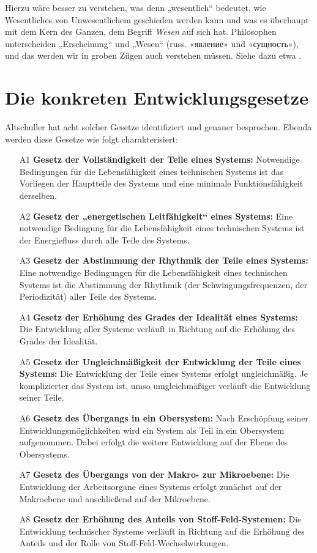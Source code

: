\documentclass[11pt,a4paper]{article}
\begin{document}
Hierzu wäre besser zu verstehen, was denn „wesentlich“ bedeutet, wie
Wesentliches von Unwesentlichem geschieden werden kann und was es überhaupt
mit dem Kern des Ganzen, dem Begriff \emph{Wesen} auf sich hat.  Philosophen
unterscheiden „Erscheinung“ und „Wesen“
(russ. \foreignlanguage{russian}{«явление»} und
\foreignlanguage{russian}{«сущность»}), und das werden wir in groben Zügen
auch verstehen müssen. Siehe dazu etwa \cite{Schlemm2004}.
\newpage

\section{Die konkreten Entwicklungsgesetze}

Altschuller \cite[S. 124\,ff.]{Altschuller1984} hat acht solcher Gesetze
identifiziert und genauer besprochen. Ebenda werden diese Gesetze wie folgt
charakterisiert:
\begin{enumerate}[noitemsep]
\item[A1] \textbf{Gesetz der Vollständigkeit der Teile eines Systems:}
  Notwendige Bedingungen für die Lebensfähigkeit eines technischen Systems ist
  das Vorliegen der Hauptteile des Systems und eine minimale
  Funktionsfähigkeit derselben.
\item[A2] \textbf{Gesetz der „energetischen Leitfähigkeit“ eines Systems:}
  Eine notwendige Bedingung für die Lebensfähigkeit eines technischen Systems
  ist der Energiefluss durch alle Teile des Systems.
\item[A3] \textbf{Gesetz der Abstimmung der Rhythmik der Teile eines Systems:}
  Eine notwendige Bedingungen für die Lebensfähigkeit eines technischen
  Systems ist die Abstimmung der Rhythmik (der Schwingungsfrequenzen, der
  Periodizität) aller Teile des Systems.
\item[A4] \textbf{Gesetz der Erhöhung des Grades der Idealität eines Systems:}
  Die Entwicklung aller Systeme verläuft in Richtung auf die Erhöhung des
  Grades der Idealität.
\item[A5] \textbf{Gesetz der Ungleichmäßigkeit der Entwicklung der Teile eines
  Systems:} Die Entwicklung der Teile eines Systems erfolgt ungleichmäßig. Je
  komplizierter das System ist, umso umgleichmäßiger verläuft die Entwicklung
  seiner Teile.
\item[A6] \textbf{Gesetz des Übergangs in ein Obersystem:} Nach Erschöpfung
  seiner Entwicklungsmöglichkeiten wird ein System als Teil in ein Obersystem
  aufgenommen. Dabei erfolgt die weitere Entwicklung auf der Ebene des
  Obersystems.
\item[A7] \textbf{Gesetz des Übergangs von der Makro- zur Mikroebene:} Die
  Entwicklung der Arbeitsorgane eines Systems erfolgt zunächst auf der
  Makroebene und anschließend auf der Mikroebene.
\item[A8] \textbf{Gesetz der Erhöhung des Anteils von Stoff-Feld-Systemen:}
  Die Entwicklung technischer Systeme verläuft in Richtung auf die Erhöhung
  des Anteils und der Rolle von Stoff-Feld-Wechselwirkungen.
\end{enumerate}
\end{document}
